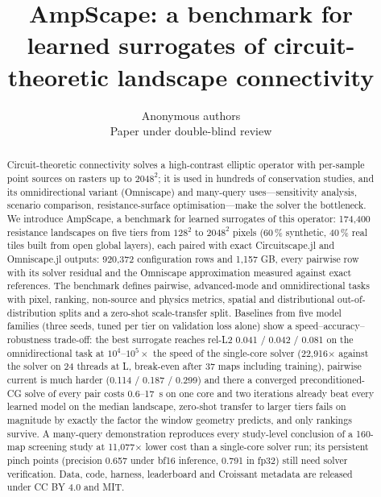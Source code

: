 \documentclass{article}
\title{AmpScape: a benchmark for learned surrogates of circuit-theoretic landscape connectivity}
\author{%
  Anonymous authors\\
  Paper under double-blind review\\
}
\newcommand{\relltwo}{rel-L2}
\begin{document}
\maketitle

\begin{abstract}
Circuit-theoretic connectivity solves a high-contrast elliptic operator with per-sample point sources on rasters up to $2048^2$; it is used in hundreds of conservation studies, and its omnidirectional variant (Omniscape) and many-query uses---sensitivity analysis, scenario comparison, resistance-surface optimisation---make the solver the bottleneck. We introduce AmpScape, a benchmark for learned surrogates of this operator: 174,400 resistance landscapes on five tiers from $128^2$ to $2048^2$ pixels (60\,\% synthetic, 40\,\% real tiles built from open global layers), each paired with exact Circuitscape.jl and Omniscape.jl outputs: 920,372 configuration rows and 1,157 GB, every pairwise row with its solver residual and the Omniscape approximation measured against exact references. The benchmark defines pairwise, advanced-mode and omnidirectional tasks with pixel, ranking, non-source and physics metrics, spatial and distributional out-of-distribution splits and a zero-shot scale-transfer split. Baselines from five model families (three seeds, tuned per tier on validation loss alone) show a speed--accuracy--robustness trade-off: the best surrogate reaches \relltwo{} 0.041 / 0.042 / 0.081 on the omnidirectional task at $10^4$--$10^5\times$ the speed of the single-core solver (22,916$\times$ against the solver on 24 threads at L, break-even after 37 maps including training), pairwise current is much harder (0.114 / 0.187 / 0.299) and there a converged preconditioned-CG solve of every pair costs 0.6--17~s on one core and two iterations already beat every learned model on the median landscape, zero-shot transfer to larger tiers fails on magnitude by exactly the factor the window geometry predicts, and only rankings survive. A many-query demonstration reproduces every study-level conclusion of a 160-map screening study at 11,077$\times$ lower cost than a single-core solver run; its persistent pinch points (precision 0.657 under bf16 inference, 0.791 in fp32) still need solver verification. Data, code, harness, leaderboard and Croissant metadata are released under CC BY 4.0 and MIT.
\end{abstract}
\end{document}
